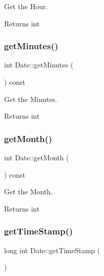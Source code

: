 Get the Hour. 

\begin{DoxyReturn}{Returns}
int 
\end{DoxyReturn}
\mbox{\label{classDate_a55251df891f43b9f19419cd79ce69876}} 
\subsubsection{\texorpdfstring{get\+Minutes()}{getMinutes()}}
{\footnotesize\ttfamily int Date\+::get\+Minutes (\begin{DoxyParamCaption}{ }\end{DoxyParamCaption}) const}



Get the Minutes. 

\begin{DoxyReturn}{Returns}
int 
\end{DoxyReturn}
\mbox{\label{classDate_a332f6e3a2f6a40d73742b6dab7be0f64}} 
\subsubsection{\texorpdfstring{get\+Month()}{getMonth()}}
{\footnotesize\ttfamily int Date\+::get\+Month (\begin{DoxyParamCaption}{ }\end{DoxyParamCaption}) const}



Get the Month. 

\begin{DoxyReturn}{Returns}
int 
\end{DoxyReturn}
\mbox{\label{classDate_af047ef9ca2cf7843b921f36e9883f0a7}} 
\subsubsection{\texorpdfstring{get\+Time\+Stamp()}{getTimeStamp()}}
{\footnotesize\ttfamily long int Date\+::get\+Time\+Stamp (\begin{DoxyParamCaption}{ }\end{DoxyParamCaption})}



